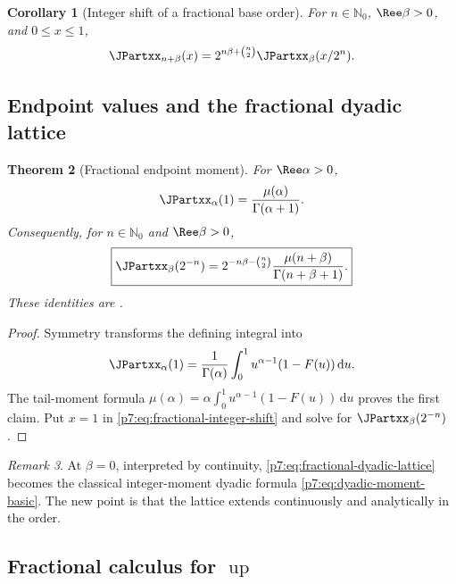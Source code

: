 \documentclass[11pt,oneside]{article}
\newtheorem{theorem}{Theorem}[section]
\newtheorem{corollary}[theorem]{Corollary}
\theoremstyle{definition}
\theoremstyle{remark}
\newtheorem{remark}[theorem]{Remark}
\newcommand{\Up}{\operatorname{up}}
\newcommand{\N}{\mathbb N}
\newcommand{\dd}{\,\mathrm d}
\newcommand{\1}{\mathbf 1}
\begin{document}
\begin{corollary}[Integer shift of a fractional base order]
\label{p7:cor:fractional-integer-shift}
For $n\in\N_0$, $\Ree\beta>0$, and $0\le x\le1$,
\begin{equation}
 \JPartxx_{n+\beta}(x)
 =2^{n\beta+\binom n2}\JPartxx_\beta(x/2^n).
 \label{p7:eq:fractional-integer-shift}
\end{equation}
\end{corollary}

\subsection{Endpoint values and the fractional dyadic lattice}

\begin{theorem}[Fractional endpoint moment]
\label{p7:thm:fractional-endpoint}
For $\Ree\alpha>0$,
\begin{equation}
 \JPartxx_\alpha(1)=\frac{\mu(\alpha)}{\Gamma(\alpha+1)}.
 \label{p7:eq:fractional-endpoint}
\end{equation}
Consequently, for $n\in\N_0$ and $\Ree\beta>0$,
\begin{equation}
 \boxed{
 \JPartxx_\beta(2^{-n})
 =2^{-n\beta-\binom n2}
 \frac{\mu(n+\beta)}{\Gamma(n+\beta+1)}.}
 \label{p7:eq:fractional-dyadic-lattice}
\end{equation}
These identities are \statusproved.
\end{theorem}

\begin{proof}
Symmetry transforms the defining integral into
\[
 \JPartxx_\alpha(1)=\frac1{\Gamma(\alpha)}\int_0^1u^{\alpha-1}(1-F(u))\dd u.
\]
The tail-moment formula
$\mu(\alpha)=\alpha\int_0^1u^{\alpha-1}(1-F(u))\dd u$ proves the first claim.  Put $x=1$ in
\cref{p7:eq:fractional-integer-shift} and solve for $\JPartxx_\beta(2^{-n})$.
\end{proof}

\begin{remark}
At $\beta=0$, interpreted by continuity, \cref{p7:eq:fractional-dyadic-lattice} becomes the
classical integer-moment dyadic formula \cref{p7:eq:dyadic-moment-basic}.  The new point is that
the lattice extends continuously and analytically in the order.
\end{remark}

\subsection{Fractional calculus for $\Up$}
\end{document}

